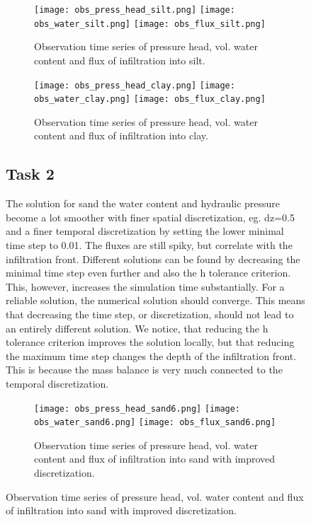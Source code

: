 \documentclass[
10pt, %
a4paper, %
oneside, %
headinclude,footinclude, %
BCOR5mm, %
]{scrartcl}
\begin{document}
\begin{figure}[!h]
\begin{figure}[!h]
\centering
\texttt{[image: obs\_press\_head\_silt.png]}
\texttt{[image: obs\_water\_silt.png]}
\texttt{[image: obs\_flux\_silt.png]}
\caption{Observation time series of pressure head, vol. water content and flux of infiltration into silt.}

\end{figure}


\begin{figure}[!h]
\centering
\texttt{[image: obs\_press\_head\_clay.png]}
\texttt{[image: obs\_water\_clay.png]}
\texttt{[image: obs\_flux\_clay.png]}
\caption{Observation time series of pressure head, vol. water content and flux of infiltration into clay.}

\end{figure}

\newpage
\newpage
\subsection*{Task 2}

The solution for sand the water content and hydraulic pressure become a lot smoother with finer spatial discretization, eg. dz=0.5 and a finer temporal discretization by setting the lower minimal time step to 0.01. The fluxes are still spiky, but correlate with the infiltration front. Different solutions can be found by decreasing the minimal time step even further and also the h tolerance criterion. This, however, increases the simulation time substantially. For a reliable solution, the numerical solution should converge. This means that decreasing the time step, or discretization, should not lead to an entirely different solution. We notice, that reducing the h tolerance criterion improves the solution locally, but that reducing the maximum time step changes the depth of the infiltration front. This is because the mass balance is very much connected to the temporal discretization.

\begin{figure}[!h]
	\centering
	\texttt{[image: obs\_press\_head\_sand6.png]}
	\texttt{[image: obs\_water\_sand6.png]}
	\texttt{[image: obs\_flux\_sand6.png]}
	\caption{Observation time series of pressure head, vol. water content and flux of infiltration into sand with improved discretization.}
\end{figure}


\end{figure}
\end{document}
